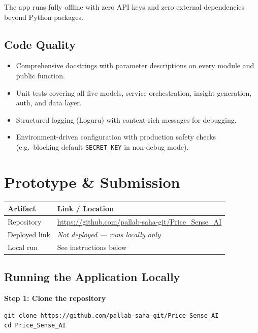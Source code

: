 \documentclass[11pt, a4paper]{article}
\begin{document}
The app runs fully offline with zero API keys and zero external dependencies beyond Python packages.

\subsection{Code Quality}
\begin{itemize}[leftmargin=1.5em]
    \item Comprehensive docstrings with parameter descriptions on every module and public function.
    \item Unit tests covering all five models, service orchestration, insight generation, auth, and data layer.
    \item Structured logging (Loguru) with context-rich messages for debugging.
    \item Environment-driven configuration with production safety checks (e.g.\ blocking default \texttt{SECRET\_KEY} in non-debug mode).
\end{itemize}


\section{Prototype \& Submission}

\begin{tabularx}{\textwidth}{| l | X |}
    \hline
    \textbf{Artifact} & \textbf{Link / Location} \\
    \hline\hline
    Repository    & \url{https://github.com/pallab-saha-git/Price_Sense_AI} \\
    \hline
    Deployed link & \textit{Not deployed --- runs locally only} \\
    \hline
    Local run     & See instructions below \\
    \hline
\end{tabularx}

\subsection{Running the Application Locally}

\textbf{Step 1: Clone the repository}
\begin{verbatim}
git clone https://github.com/pallab-saha-git/Price_Sense_AI
cd Price_Sense_AI
\end{verbatim}
\end{document}
